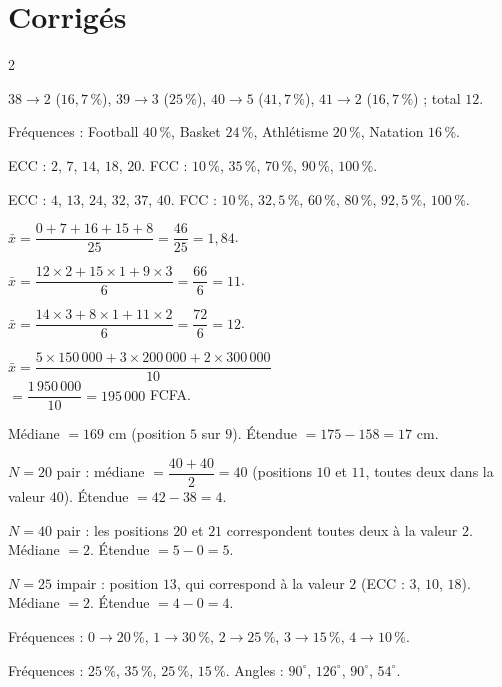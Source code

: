 \section{Corrigés}
\begin{multicols}{2}

$38\to2$ ($16{,}7\,\%$), $39\to3$ ($25\,\%$), $40\to5$ ($41{,}7\,\%$), $41\to2$
($16{,}7\,\%$) ; total $12$.

Fréquences : Football $40\,\%$, Basket $24\,\%$, Athlétisme $20\,\%$, Natation $16\,\%$.

ECC : $2$, $7$, $14$, $18$, $20$. FCC : $10\,\%$, $35\,\%$, $70\,\%$, $90\,\%$, $100\,\%$.

ECC : $4$, $13$, $24$, $32$, $37$, $40$. FCC : $10\,\%$, $32{,}5\,\%$, $60\,\%$, $80\,\%$,
$92{,}5\,\%$, $100\,\%$.

$\bar{x}=\dfrac{0+7+16+15+8}{25}=\dfrac{46}{25}=1{,}84$.

$\bar{x}=\dfrac{12\times2+15\times1+9\times3}{6}=\dfrac{66}{6}=11$.

$\bar{x}=\dfrac{14\times3+8\times1+11\times2}{6}=\dfrac{72}{6}=12$.

$\bar{x}=\dfrac{5\times150\,000+3\times200\,000+2\times300\,000}{10}$\\
$=\dfrac{1\,950\,000}{10}=195\,000$ FCFA.

Médiane $=169$ cm (position $5$ sur $9$). Étendue $=175-158=17$ cm.

$N=20$ pair : médiane $=\dfrac{40+40}{2}=40$ (positions $10$ et $11$, toutes deux dans la
valeur $40$). Étendue $=42-38=4$.

$N=40$ pair : les positions $20$ et $21$ correspondent toutes deux à la valeur $2$.
Médiane $=2$. Étendue $=5-0=5$.

$N=25$ impair : position $13$, qui correspond à la valeur $2$ (ECC : $3$, $10$, $18$).
Médiane
$=2$. Étendue $=4-0=4$.

Fréquences : $0\to20\,\%$, $1\to30\,\%$, $2\to25\,\%$, $3\to15\,\%$, $4\to10\,\%$.

Fréquences : $25\,\%$, $35\,\%$, $25\,\%$, $15\,\%$. Angles : $90^{\circ}$, $126^{\circ}$,
$90^{\circ}$, $54^{\circ}$.


\end{multicols}
